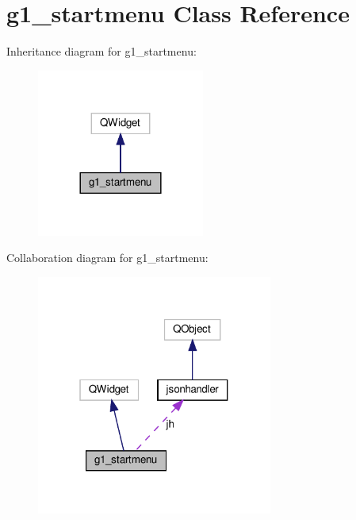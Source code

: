 \hypertarget{classg1__startmenu}{}\section{g1\+\_\+startmenu Class Reference}
\label{classg1__startmenu}


Inheritance diagram for g1\+\_\+startmenu\+:
\nopagebreak
\begin{figure}[H]
\begin{center}
\leavevmode
\includegraphics[width=156pt]{classg1__startmenu__inherit__graph}
\end{center}
\end{figure}


Collaboration diagram for g1\+\_\+startmenu\+:
\nopagebreak
\begin{figure}[H]
\begin{center}
\leavevmode
\includegraphics[width=220pt]{classg1__startmenu__coll__graph}
\end{center}
\end{figure}
